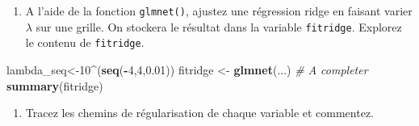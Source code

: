 \documentclass[
]{article}
\newenvironment{Shaded}{\begin{snugshade}}{\end{snugshade}}
\newcommand{\AttributeTok}[1]{\textcolor[rgb]{0.13,0.29,0.53}{#1}}
\newcommand{\CommentTok}[1]{\textcolor[rgb]{0.56,0.35,0.01}{\textit{#1}}}
\newcommand{\DecValTok}[1]{\textcolor[rgb]{0.00,0.00,0.81}{#1}}
\newcommand{\FloatTok}[1]{\textcolor[rgb]{0.00,0.00,0.81}{#1}}
\newcommand{\FunctionTok}[1]{\textcolor[rgb]{0.13,0.29,0.53}{\textbf{#1}}}
\newcommand{\NormalTok}[1]{#1}
\newcommand{\OtherTok}[1]{\textcolor[rgb]{0.56,0.35,0.01}{#1}}
\newcommand{\SpecialCharTok}[1]{\textcolor[rgb]{0.81,0.36,0.00}{\textbf{#1}}}
\newcommand{\StringTok}[1]{\textcolor[rgb]{0.31,0.60,0.02}{#1}}
\providecommand{\tightlist}{%
  \setlength{\itemsep}{0pt}\setlength{\parskip}{0pt}}
\begin{document}
\begin{enumerate}
\def\labelenumi{\arabic{enumi}.}
\tightlist
\item
  A l'aide de la fonction \texttt{glmnet()}, ajustez une régression
  ridge en faisant varier \(\lambda\) sur une grille. On stockera le
  résultat dans la variable \texttt{fitridge}. Explorez le contenu de
  \texttt{fitridge}.
\end{enumerate}

\begin{Shaded}
\begin{Highlighting}[]
\NormalTok{lambda\_seq}\OtherTok{\textless{}{-}}\DecValTok{10}\SpecialCharTok{\^{}}\NormalTok{(}\FunctionTok{seq}\NormalTok{(}\SpecialCharTok{{-}}\DecValTok{4}\NormalTok{,}\DecValTok{4}\NormalTok{,}\FloatTok{0.01}\NormalTok{))}
\NormalTok{fitridge }\OtherTok{\textless{}{-}} \FunctionTok{glmnet}\NormalTok{(...) }\CommentTok{\# A completer}
\FunctionTok{summary}\NormalTok{(fitridge)}
\end{Highlighting}
\end{Shaded}

\begin{enumerate}
\def\labelenumi{\arabic{enumi}.}
\setcounter{enumi}{1}
\tightlist
\item
  Tracez les chemins de régularisation de chaque variable et commentez.
\end{enumerate}

\begin{Shaded}
\end{Shaded}
\end{document}
